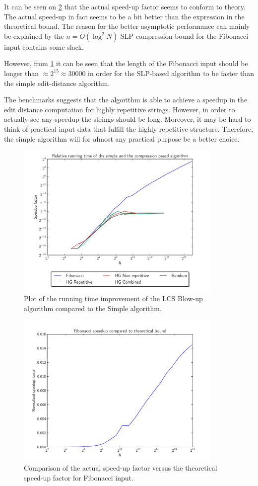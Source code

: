 \documentclass[twoside,11pt,openright]{report}
\begin{document}
It can be seen on \cref{fig:benchmark:simple-vs-lcsblowup-fib} that the actual speed-up factor seems to conform to theory. The actual speed-up in fact seems to be a bit better than the expression in the theoretical bound. The reason for the better asymptotic performance can mainly be explained by the $n = O(\log^2{N})$ SLP compression bound for the Fibonacci input contains some slack.

However, from \cref{fig:benchmark:simple-vs-lcsblowup} it can be seen that the length of the Fibonacci input should be longer than $\approx 2^{15} \approx 30000$ in order for the SLP-based algorithm to be faster than the simple edit-distance algorithm.

The benchmarks suggests that the algorithm is able to achieve a speedup in the edit distance computation for highly repetitive strings. However, in order to actually see any speedup the strings should be long. Moreover, it may be hard to think of practical input data that fulfill the highly repetitive structure. Therefore, the simple algorithm will for almost any practical purpose be a better choice.

\begin{figure}[!htb]
  \centering
  \includegraphics[width=10cm]{combined/simple_vs_lcs}
  \caption{Plot of the running time improvement of the LCS Blow-up algorithm compared to the Simple algorithm.}
  \label{fig:benchmark:simple-vs-lcsblowup}
\end{figure}

\begin{figure}[!htb]
  \centering
  \includegraphics[width=10cm]{combined/simple-vs-lcs-fib}
  \caption{Comparison of the actual speed-up factor versus the theoretical speed-up factor for Fibonacci input.}
  \label{fig:benchmark:simple-vs-lcsblowup-fib}
\end{figure}
\end{document}
